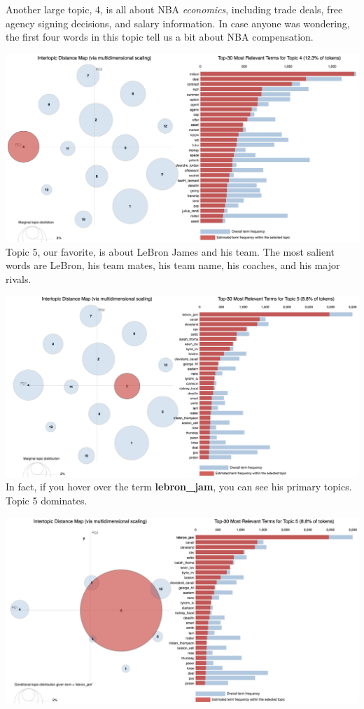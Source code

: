 \documentclass[11pt]{article}
\begin{document}
Another large topic, 4, is all about NBA \textit{economics}, including trade deals, free agency signing decisions, and salary information.  In case anyone was wondering, the first four words in this topic tell us a bit about NBA compensation.

\includegraphics[width=470pt]{4.png} \\

Topic 5, our favorite, is about LeBron James and his team.  The most salient words are LeBron, his team mates, his team name, his coaches, and his major rivals.  

\includegraphics[width=470pt]{5.png} \\

In fact, if you hover over the term \textbf{lebron\_jam}, you can see his primary topics. Topic 5 dominates.

\includegraphics[width=470pt]{5_LeBron.png}  \\
\end{document}
